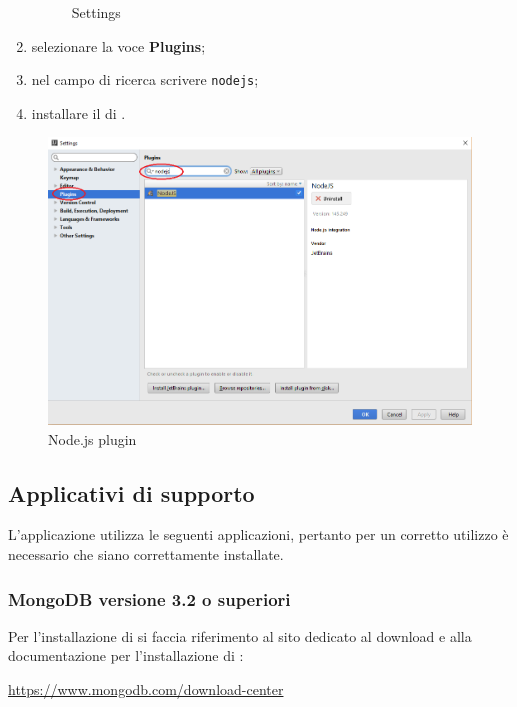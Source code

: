 \documentclass[12pt,a4paper]{article}
\begin{document}
\begin{enumerate}
\begin{center}
\begin{figure}[H]
				\caption{Settings}
			\end{figure}
		\end{center}

		\item selezionare la voce \textbf{Plugins};
		\item nel campo di ricerca scrivere \texttt{nodejs};
		\item installare il  di .
	\end{enumerate}
	\begin{center}
		\begin{figure}[H]
			\centering
			\includegraphics[max width=\textwidth, scale=0.7]{../img/manualeSviluppatore/plugin.png}
			\caption{Node.js plugin}
		\end{figure}
	\end{center}
	
	\subsection{Applicativi di supporto} \label{app_supporto}
		
		L'applicazione \prj{} utilizza le seguenti applicazioni, pertanto per un corretto utilizzo è necessario che siano correttamente installate.
		\subsubsection{MongoDB versione 3.2 o superiori}
		Per l'installazione di  si faccia riferimento al sito dedicato al download e alla documentazione per l'installazione di :
		\begin{center} \url{https://www.mongodb.com/download-center}
		\end{center}
		
\end{document}
